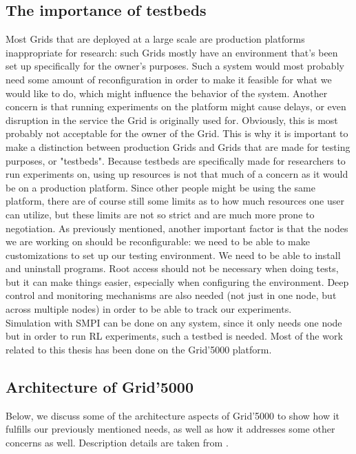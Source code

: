 \subsection{The importance of testbeds}
Most Grids that are deployed at a large scale are production platforms
inappropriate for research: such Grids mostly have an environment
that's been
set up specifically for the owner's purposes. Such a system would most
probably need some amount of reconfiguration in order to make it
feasible for what we would like to do, which might influence the
behavior of the system. Another concern is that running experiments on
the platform might cause delays, or even disruption in the
service the Grid is originally used for. Obviously, this is most
probably not acceptable for the owner of the Grid. This is why it is
important to make a distinction between production Grids and Grids
that are made for testing purposes, or "testbeds". Because testbeds
are specifically made for researchers to run experiments on, using up
resources is not that much of a concern as it would be on a production
platform. Since other people might be using the same platform, there
are of course still some limits as to how much resources one user can
utilize, but these limits are not so strict and are much more prone to
negotiation. As previously mentioned, another important factor is that
the nodes we are working on should be reconfigurable: we need to be
able to make customizations to set up our testing environment. We need
to be able to install and uninstall programs. Root access should not
be necessary when doing tests, but it can make things easier,
especially when configuring the environment. Deep control and
monitoring
mechanisms are also needed (not just in one node, but across multiple
nodes) in order to be able to track our experiments.\\[0.3cm]
Simulation with SMPI can be done on any system, since it only needs
one node but in order to run RL experiments, such a testbed is
needed. Most of the work related to this thesis has been done on the
Grid'5000 platform.\cite{bccddjjllmmnpqrtt06}
\subsection{Architecture of Grid'5000}
Below, we discuss some of the architecture aspects of Grid'5000 to
show how it fulfills our previously mentioned needs, as well as how it
addresses some other concerns as well. Description details are taken
from \cite{bccddjjllmmnpqrtt06}.
